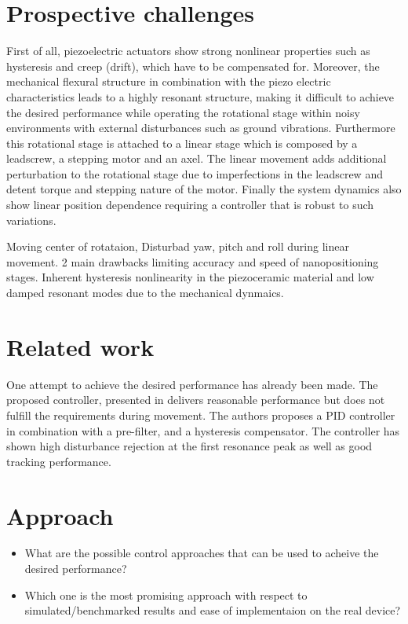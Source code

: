 \section{Prospective challenges}\label{sec:prospectiveChallanges}
First of all, piezoelectric  actuators show strong nonlinear properties such as hysteresis and creep (drift), which have to be compensated for. Moreover, the mechanical flexural structure in combination with the piezo electric characteristics leads to a highly resonant structure, making it difficult to achieve the desired performance while operating the rotational stage within noisy environments with external disturbances such as ground vibrations. Furthermore this rotational stage is attached to a linear stage which is composed by a leadscrew, a stepping motor and an axel. The linear movement adds additional perturbation to the rotational stage due to imperfections in the leadscrew and detent torque and stepping nature of the motor. Finally the system dynamics also show linear position dependence requiring a controller that is robust to such variations.

Moving center of rotataion,
Disturbad yaw, pitch and roll during linear movement.
2 main drawbacks limiting accuracy and speed of nanopositioning stages. Inherent hysteresis nonlinearity in the piezoceramic material and low damped resonant modes due to the mechanical dynmaics. 

\section{Related work}
One attempt to achieve the desired performance has already been made. The proposed controller, presented in \citep{ButcherController:2015} delivers reasonable performance but does not fulfill the requirements during movement. The authors proposes a PID controller in combination with a pre-filter, and a hysteresis compensator. The controller has shown high disturbance rejection at the first resonance peak as well as good tracking performance.

\section{Approach}

\begin{itemize}
  \item What are the possible control approaches that can be used to acheive the desired performance?
  \item Which one is the most promising approach with respect to simulated/benchmarked results and ease of implementaion on the real device?
\end{itemize}

